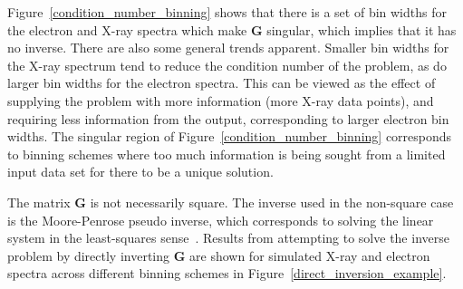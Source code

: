 Figure~\ref{condition_number_binning} shows that there is a set of bin widths for the electron and X-ray spectra which make $\mathbf{G}$ singular, which implies that it has no inverse. There are also some general trends apparent. Smaller bin widths for the X-ray spectrum tend to reduce the condition number of the problem, as do larger bin widths for the electron spectra. This can be viewed as the effect of supplying the problem with more information (more X-ray data points), and requiring less information from the output, corresponding to larger electron bin widths. The singular region of Figure~\ref{condition_number_binning} corresponds to binning schemes where too much information is being sought from a limited input data set for there to be a unique solution.

The matrix $\mathbf{G}$ is not necessarily square. The inverse used in the non-square case is the Moore-Penrose pseudo inverse, which corresponds to solving the linear system in the least-squares sense~\citep{Dresden1920,Bjerhammar1951}. Results from attempting to solve the inverse problem by directly inverting $\mathbf{G}$ are shown for simulated X-ray and electron spectra across different binning schemes in Figure~\ref{direct_inversion_example}.

